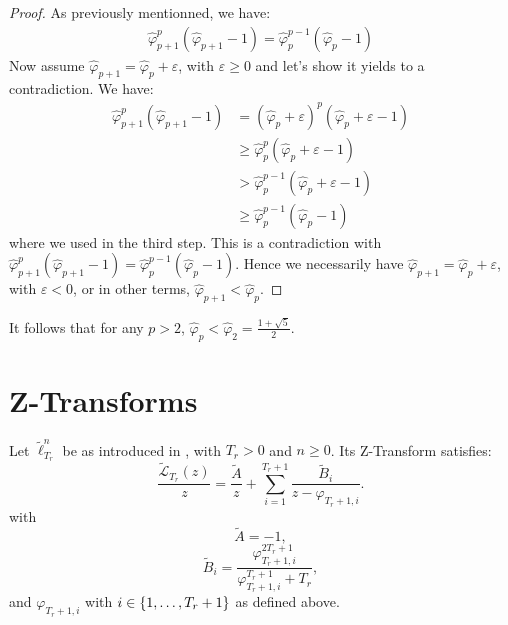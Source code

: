 \documentclass{article}
\begin{document}
    \begin{proof}
      As previously mentionned, we have:
      \begin{align}
        \hat{\varphi}_{p+1}^{p}(\hat{\varphi}_{p+1} - 1) = \hat{\varphi}_{p}^{p-1}(\hat{\varphi}_{p} - 1) 
      \end{align}
      Now assume $\hat{\varphi}_{p+1} = \hat{\varphi}_{p} + \varepsilon$, with $\varepsilon \geq 0$ and let's show it yields to 
      a contradiction. We have:
      \begin{align} 
        \hat{\varphi}_{p+1}^{p}(\hat{\varphi}_{p+1} - 1) 
        & = (\hat{\varphi}_{p} + \varepsilon)^{p}(\hat{\varphi}_{p} + \varepsilon - 1) \\
        & \geq \hat{\varphi}_{p}^{p}(\hat{\varphi}_{p} + \varepsilon - 1) \\
        & > \hat{\varphi}_{p}^{p-1}(\hat{\varphi}_{p} + \varepsilon - 1) \\
        & \geq \hat{\varphi}_{p}^{p-1}(\hat{\varphi}_{p} - 1)
      \end{align}
      where we used  in the third step. This is a contradiction with $\hat{\varphi}_{p+1}^{p}(\hat{\varphi}_{p+1} - 1) 
      = \hat{\varphi}_{p}^{p-1}(\hat{\varphi}_{p} - 1)$. Hence we necessarily have $\hat{\varphi}_{p+1} = \hat{\varphi}_{p} + \varepsilon$,
      with $\varepsilon < 0$, or in other terms, $\hat{\varphi}_{p+1} < \hat{\varphi}_{p}$.
    \end{proof}

    \begin{remark}
     It follows that for any $p > 2$, $\hat{\varphi}_p < \hat{\varphi}_2 = \frac{1 + \sqrt{5}}{2}$.
    \end{remark}

    \section{Z-Transforms}

    \begin{theorem} \label{thm:1-mainz}
      Let $\tilde{\ell}_{T_r}^{n}$ be as introduced in , with $T_r > 0$ and $n \geq 0$. 
      Its Z-Transform satisfies:
      \begin{equation}
        \frac{\tilde{\mathcal{L}}_{T_r}(z)}{z} = \frac{\tilde{A}}{z} + \sum_{i=1}^{T_r + 1} \frac{\tilde{B}_i}{z - \varphi_{T_r + 1, i}}.
      \end{equation}
      with 
      \begin{equation}
        \tilde{A} = -1,
      \end{equation}
      \begin{equation}
        \tilde{B}_i = \frac{\varphi_{T_r + 1, i}^{2T_r + 1}}{\varphi_{T_r + 1, i}^{T_r + 1} + T_r},
      \end{equation}
      and $\varphi_{T_r + 1, i}$ with $i \in \{1, \dots, T_r + 1\}$ as defined above.
    \end{theorem}
\end{document}
